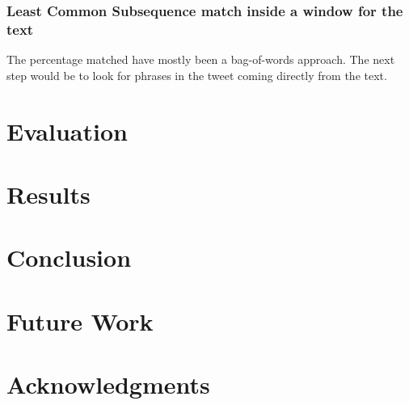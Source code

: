 \documentclass[11pt]{article}
\begin{document}
\subsubsection{Least Common Subsequence match inside a window for the text}

The percentage matched have mostly been a bag-of-words approach. The next step would be to look for phrases in the tweet coming directly from the text.


\section{Evaluation}

\section{Results}

\section{Conclusion}

\section{Future Work}

\section*{Acknowledgments}




\end{document}
